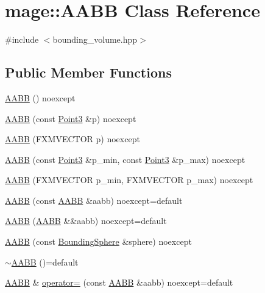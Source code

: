\hypertarget{classmage_1_1_a_a_b_b}{}\section{mage\+:\+:A\+A\+BB Class Reference}
\label{classmage_1_1_a_a_b_b}


{\ttfamily \#include $<$bounding\+\_\+volume.\+hpp$>$}

\subsection*{Public Member Functions}
\begin{DoxyCompactItemize}
\item 
\hyperlink{classmage_1_1_a_a_b_b_a4bf8c44135580cda2ab0c78da14c634e}{A\+A\+BB} () noexcept
\item 
\hyperlink{classmage_1_1_a_a_b_b_a97a4a755cb0b9c017fd5a311576a5c00}{A\+A\+BB} (const \hyperlink{structmage_1_1_point3}{Point3} \&p) noexcept
\item 
\hyperlink{classmage_1_1_a_a_b_b_a1876b5d2aaaef6409983395d7d5a2c04}{A\+A\+BB} (F\+X\+M\+V\+E\+C\+T\+OR p) noexcept
\item 
\hyperlink{classmage_1_1_a_a_b_b_a3d62727af89f01bbe4026da9093dc682}{A\+A\+BB} (const \hyperlink{structmage_1_1_point3}{Point3} \&p\+\_\+min, const \hyperlink{structmage_1_1_point3}{Point3} \&p\+\_\+max) noexcept
\item 
\hyperlink{classmage_1_1_a_a_b_b_a1b3e825922055027b53151c8eeb419ad}{A\+A\+BB} (F\+X\+M\+V\+E\+C\+T\+OR p\+\_\+min, F\+X\+M\+V\+E\+C\+T\+OR p\+\_\+max) noexcept
\item 
\hyperlink{classmage_1_1_a_a_b_b_abfd1c0d221df7aacc29b06afcd609994}{A\+A\+BB} (const \hyperlink{classmage_1_1_a_a_b_b}{A\+A\+BB} \&aabb) noexcept=default
\item 
\hyperlink{classmage_1_1_a_a_b_b_ad679d44369d5300de286e1fef947df1f}{A\+A\+BB} (\hyperlink{classmage_1_1_a_a_b_b}{A\+A\+BB} \&\&aabb) noexcept=default
\item 
\hyperlink{classmage_1_1_a_a_b_b_a16194c87d55c8461402682c3ff5db730}{A\+A\+BB} (const \hyperlink{classmage_1_1_bounding_sphere}{Bounding\+Sphere} \&sphere) noexcept
\item 
\hyperlink{classmage_1_1_a_a_b_b_a0fa31372f7488cb30b886c77bd676f17}{$\sim$\+A\+A\+BB} ()=default
\item 
\hyperlink{classmage_1_1_a_a_b_b}{A\+A\+BB} \& \hyperlink{classmage_1_1_a_a_b_b_a11ba6858dfeaf17cc3e297385c925a8b}{operator=} (const \hyperlink{classmage_1_1_a_a_b_b}{A\+A\+BB} \&aabb) noexcept=default

\end{DoxyCompactItemize}
